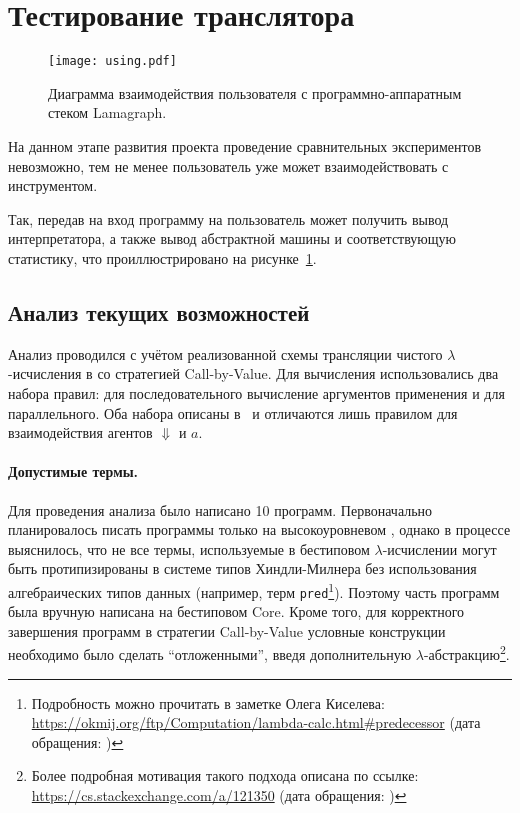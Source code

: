 
\section{Тестирование транслятора}

\begin{figure}[h]
    \begin{center}
        \texttt{[image: using.pdf]}
    \end{center}
    \caption{Диаграмма взаимодействия пользователя с программно-аппаратным стеком Lamagraph.}
    \label{fig:using}
\end{figure}

На данном этапе развития проекта проведение сравнительных экспериментов невозможно, тем не менее пользователь уже может взаимодействовать с инструментом.

Так, передав на вход программу на \LamagraphML{} пользователь может получить вывод интерпретатора, а также вывод абстрактной машины и соответствующую статистику, что проиллюстрировано на рисунке~\ref{fig:using}.

\subsection*{Анализ текущих возможностей}

Анализ проводился с учётом реализованной схемы трансляции чистого $\lambda$-исчисления в \INs{} со стратегией Call-by-Value.
Для вычисления использовались два набора правил: для последовательного вычисление аргументов применения и для параллельного.
Оба набора описаны в~\cite{sinotCallbyNameCallbyValueTokenPassing2005} и отличаются лишь правилом для взаимодействия агентов $\Downarrow$ и $a$.

\paragraph{Допустимые термы.}
Для проведения анализа было написано 10 программ.
Первоначально планировалось писать программы только на высокоуровневом \LamagraphML{}, однако в процессе выяснилось, что не все термы, используемые в бестиповом $\lambda$-исчислении могут быть протипизированы в системе типов Хиндли-Милнера без использования алгебраических типов данных (например, терм \texttt{pred}\footnote{Подробность можно прочитать в заметке Олега Киселева: \url{https://okmij.org/ftp/Computation/lambda-calc.html\#predecessor} (дата обращения: )}).
Поэтому часть программ была вручную написана на бестиповом Core.
Кроме того, для корректного завершения программ в стратегии Call-by-Value условные конструкции необходимо было сделать \enquote{отложенными}, введя дополнительную $\lambda$-абстракцию\footnote{Более подробная мотивация такого подхода описана по ссылке: \url{https://cs.stackexchange.com/a/121350} (дата обращения: )}.

